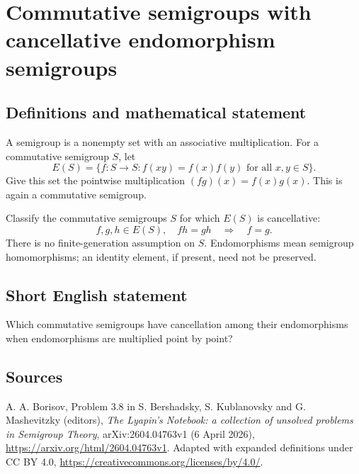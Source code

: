 \documentclass{article}
\begin{document}
\section*{Commutative semigroups with cancellative endomorphism semigroups}
\subsection{Definitions and mathematical statement}
A semigroup is a nonempty set with an associative multiplication. For a
commutative semigroup $S$, let
\[
 E(S)=\{f:S\longrightarrow S:f(xy)=f(x)f(y)\text{ for all }x,y\in S\}.
\]
Give this set the pointwise multiplication $(fg)(x)=f(x)g(x)$.
This is again a commutative semigroup.

Classify the commutative semigroups $S$ for which $E(S)$ is cancellative:
\[
 f,g,h\in E(S),\quad fh=gh\quad\Longrightarrow\quad f=g.
\]
There is no finite-generation assumption on $S$. Endomorphisms mean semigroup
homomorphisms; an identity element, if present, need not be preserved.

\subsection{Short English statement}
Which commutative semigroups have cancellation among their endomorphisms
when endomorphisms are multiplied point by point?

\subsection{Sources}
A. A. Borisov, Problem 3.8 in S. Bershadsky, S. Kublanovsky and
G. Mashevitzky (editors), \emph{The Lyapin's Notebook: a collection of unsolved
problems in Semigroup Theory}, arXiv:2604.04763v1 (6 April 2026),
\url{https://arxiv.org/html/2604.04763v1}.
Adapted with expanded definitions under CC BY 4.0,
\url{https://creativecommons.org/licenses/by/4.0/}.
\end{document}
